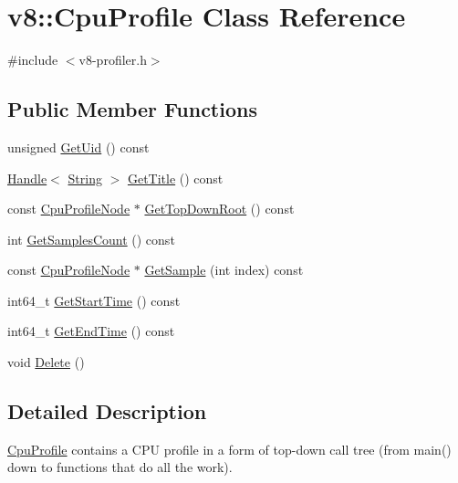 \hypertarget{classv8_1_1_cpu_profile}{}\section{v8\+:\+:Cpu\+Profile Class Reference}
\label{classv8_1_1_cpu_profile}


{\ttfamily \#include $<$v8-\/profiler.\+h$>$}

\subsection*{Public Member Functions}
\begin{DoxyCompactItemize}
\item 
unsigned \hyperlink{classv8_1_1_cpu_profile_a382bbf10d24a2cd8b17acb8508c56a58}{Get\+Uid} () const 
\item 
\hyperlink{classv8_1_1_handle}{Handle}$<$ \hyperlink{classv8_1_1_string}{String} $>$ \hyperlink{classv8_1_1_cpu_profile_afbb44d5cf0a8729c9074aba03207e5cc}{Get\+Title} () const 
\item 
const \hyperlink{classv8_1_1_cpu_profile_node}{Cpu\+Profile\+Node} $\ast$ \hyperlink{classv8_1_1_cpu_profile_aec978f073af6634b6495baa65209a31f}{Get\+Top\+Down\+Root} () const 
\item 
int \hyperlink{classv8_1_1_cpu_profile_a2ca9d8e862dc2b06892196b5e5a14994}{Get\+Samples\+Count} () const 
\item 
const \hyperlink{classv8_1_1_cpu_profile_node}{Cpu\+Profile\+Node} $\ast$ \hyperlink{classv8_1_1_cpu_profile_a59470cd1286e949dd069eea87777a074}{Get\+Sample} (int index) const 
\item 
int64\+\_\+t \hyperlink{classv8_1_1_cpu_profile_aac317de54bdfc4523b5ecea522c01ad1}{Get\+Start\+Time} () const 
\item 
int64\+\_\+t \hyperlink{classv8_1_1_cpu_profile_a15170e2e9eeb972fddf949bd08dd09ff}{Get\+End\+Time} () const 
\item 
void \hyperlink{classv8_1_1_cpu_profile_a70c93f0c14d07a7e1bad42ee95665ca0}{Delete} ()
\end{DoxyCompactItemize}


\subsection{Detailed Description}
\hyperlink{classv8_1_1_cpu_profile}{Cpu\+Profile} contains a C\+P\+U profile in a form of top-\/down call tree (from main() down to functions that do all the work). 


